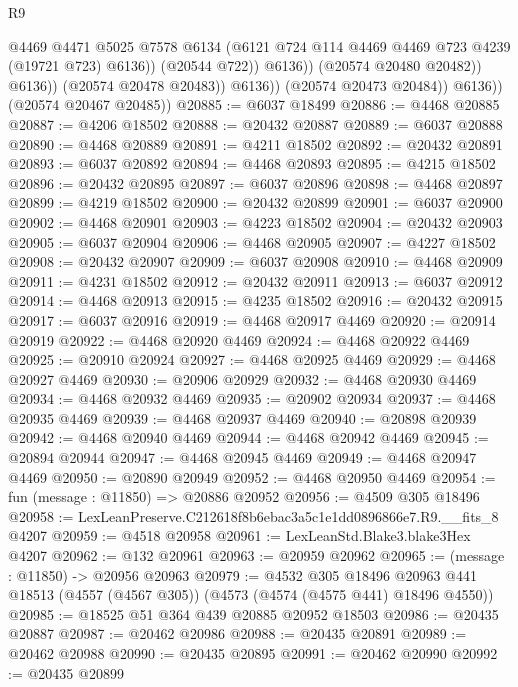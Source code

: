 \begin{lexlean}{R9}
\begin{coremodule}
                                @4469
                                @4471
                                @5025
                                @7578
                                @6134
                                (@6121 @724 @114 @4469 @4469 @723 @4239 (@19721 @723) @6136))
                              (@20544 @722))
                            @6136))
                        (@20574 @20480 @20482))
                      @6136))
                  (@20574 @20478 @20483))
                @6136))
            (@20574 @20473 @20484))
          @6136))
      (@20574 @20467 @20485))
@20885 := @6037 @18499
@20886 := @4468 @20885
@20887 := @4206 @18502
@20888 := @20432 @20887
@20889 := @6037 @20888
@20890 := @4468 @20889
@20891 := @4211 @18502
@20892 := @20432 @20891
@20893 := @6037 @20892
@20894 := @4468 @20893
@20895 := @4215 @18502
@20896 := @20432 @20895
@20897 := @6037 @20896
@20898 := @4468 @20897
@20899 := @4219 @18502
@20900 := @20432 @20899
@20901 := @6037 @20900
@20902 := @4468 @20901
@20903 := @4223 @18502
@20904 := @20432 @20903
@20905 := @6037 @20904
@20906 := @4468 @20905
@20907 := @4227 @18502
@20908 := @20432 @20907
@20909 := @6037 @20908
@20910 := @4468 @20909
@20911 := @4231 @18502
@20912 := @20432 @20911
@20913 := @6037 @20912
@20914 := @4468 @20913
@20915 := @4235 @18502
@20916 := @20432 @20915
@20917 := @6037 @20916
@20919 := @4468 @20917 @4469
@20920 := @20914 @20919
@20922 := @4468 @20920 @4469
@20924 := @4468 @20922 @4469
@20925 := @20910 @20924
@20927 := @4468 @20925 @4469
@20929 := @4468 @20927 @4469
@20930 := @20906 @20929
@20932 := @4468 @20930 @4469
@20934 := @4468 @20932 @4469
@20935 := @20902 @20934
@20937 := @4468 @20935 @4469
@20939 := @4468 @20937 @4469
@20940 := @20898 @20939
@20942 := @4468 @20940 @4469
@20944 := @4468 @20942 @4469
@20945 := @20894 @20944
@20947 := @4468 @20945 @4469
@20949 := @4468 @20947 @4469
@20950 := @20890 @20949
@20952 := @4468 @20950 @4469
@20954 := fun (message : @11850) => @20886 @20952
@20956 := @4509 @305 @18496
@20958 := LexLeanPreserve.C212618f8b6ebac3a5c1e1dd0896866e7.R9.__fits_8 @4207
@20959 := @4518 @20958
@20961 := LexLeanStd.Blake3.blake3Hex @4207
@20962 := @132 @20961
@20963 := @20959 @20962
@20965 := (message : @11850) -> @20956 @20963
@20979 := @4532
    @305
    @18496
    @20963
    @441
    @18513
    (@4557 (@4567 @305))
    (@4573 (@4574 (@4575 @441) @18496 @4550))
@20985 := @18525 @51 @364 @439 @20885 @20952 @18503
@20986 := @20435 @20887
@20987 := @20462 @20986
@20988 := @20435 @20891
@20989 := @20462 @20988
@20990 := @20435 @20895
@20991 := @20462 @20990
@20992 := @20435 @20899

\end{coremodule}
\end{lexlean}

